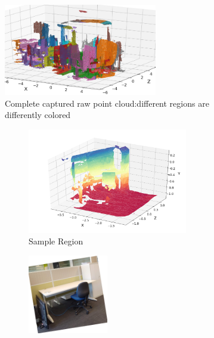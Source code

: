 \begin{figure}[t]
	\centering
	\begin{subfigure}[]{0.65\columnwidth}
		\centering
		\includegraphics[width=\textwidth,height = 4cm]{figures/complete-point-cloud-3}
		\vspace{-3mm}
		\caption{\centering Complete captured raw point cloud:\newline different regions are differently colored}
		\label{fig:point-cloud-complete}
	\end{subfigure}
	\begin{subfigure}[]{0.34\columnwidth}
		\begin{subfigure}[]{\textwidth}
    		\centering
    		\includegraphics[width=\textwidth]{figures/sample-point-cloud-2}
    		\vspace{-3mm}
    		\caption{\small\centering Sample Region}
    		\label{fig:point-cloud-sample}
		\end{subfigure}
		\begin{subfigure}[]{\textwidth}
    		\centering
    		\includegraphics[width=0.5\textwidth]{figures/space-sample.png}

\end{subfigure}
\end{subfigure}
\end{figure}

